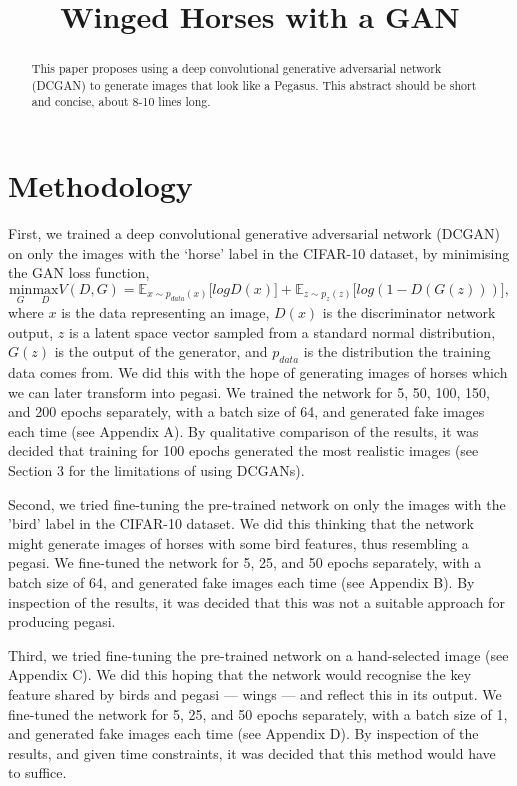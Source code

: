 \documentclass{article}
\title{Winged Horses with a GAN}
\begin{document}
\maketitle
\begin{abstract}
    This paper proposes using a deep convolutional generative adversarial network (DCGAN) to generate images that look like a Pegasus. This abstract should be short and concise, about 8-10 lines long.
\end{abstract}

\section{Methodology}
First, we trained a deep convolutional generative adversarial network (DCGAN)~\cite{} on only the images with the `horse' label in the CIFAR-10 dataset, by minimising the GAN loss function, 
\begin{equation}
    \underset{G}{\text{min}} \underset{D}{\text{max}}V(D,G) = \mathbb{E}_{x\sim p_{data}(x)}\big[logD(x)\big] + \mathbb{E}_{z\sim p_{z}(z)}\big[log(1-D(G(z)))\big],
\end{equation}
where $x$ is the data representing an image, $D(x)$ is the discriminator network output, $z$ is a latent space vector sampled from a standard normal distribution, $G(z)$ is the output of the generator, and $p_{data}$ is the distribution the training data comes from. We did this with the hope of generating images of horses which we can later transform into pegasi. We trained the network for 5, 50, 100, 150, and 200 epochs separately, with a batch size of 64, and generated fake images each time (see Appendix A). By qualitative comparison of the results, it was decided that training for 100 epochs generated the most realistic images (see Section 3 for the limitations of using DCGANs).  

Second, we tried fine-tuning the pre-trained network on only the images with the 'bird' label in the CIFAR-10 dataset. We did this thinking that the network might generate images of horses with some bird features, thus resembling a pegasi. We fine-tuned the network for 5, 25, and 50 epochs separately, with a batch size of 64, and generated fake images each time (see Appendix B). By inspection of the results, it was decided that this was not a suitable approach for producing pegasi.  

Third, we tried fine-tuning the pre-trained network on a hand-selected image (see Appendix C). We did this hoping that the network would recognise the key feature shared by birds and pegasi --- wings --- and reflect this in its output. We fine-tuned the network for 5, 25, and 50 epochs separately, with a batch size of 1, and generated fake images each time (see Appendix D). By inspection of the results, and given time constraints, it was decided that this method would have to suffice.  
\end{document}

